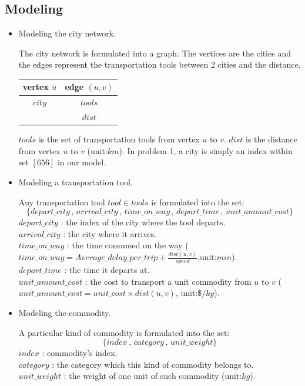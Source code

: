 \documentclass[11pt, a4paper]{article} %
\begin{document}
	\subsection{Modeling}
	\begin{itemize}
		\item Modeling the city network.\par
		The city network is formulated into a graph. The vertices are the cities and the edges represent the transportation tools between 2 cities and the distance.
		\begin{center}
			\begin{tabular}{|c|c|}
				\hline
				vertex $u$ & edge $(u,v)$ \\
				\hline
				$city$ & $tools$\\ \cline{2-2}
				& $dist$\\
				\hline
			\end{tabular}
		\end{center}
		$tools$ is the set of transportation tools from vertex $u$ to $v$. $dist$ is the distance from vertex $u$ to $v$ (unit:$km$). In problem 1, a city is simply an index within set $[656]$ in our model.\\
		\item Modeling a transportation tool.\par
		Any transportation tool $tool\in tools$ is formulated into the set:
		$$
		\{depart\_city\,,\, arrival\_city\,,\, time\_on\_way\,,\, depart\_time\,,\, unit\_amount\_cost\}
		$$
		$depart\_city$ : the index of the city where the tool departs.\\
		$arrival\_city$ : the city where it arrives. \\
		$time\_on\_way$ : the time consumed on the way ($time\_on\_way = Average\_delay\_per\_trip+\frac{dist(u,v)}{speed}$,unit:$min$).\\
		$depart\_time$ : the time it departs at.\\
		$unit\_amount\_cost$ : the cost to transport a unit commodity from $u$ to $v$ ($unit\_amount\_cost=unit\_cost\times dist(u,v)$, unit:$\$/kg$).\\
		\item Modeling the commodity.\par
		A particular kind of commodity is formulated into the set:
		$$
		\{index\,,\, category\,,\, unit\_weight\}
		$$
		$index$ : commodity's index.\\
		$category$ : the category which this kind of commodity belongs to.\\
		$unit\_weight$ : the weight of one unit of such commodity (unit:$kg$).\\

\end{itemize}
\end{document}
